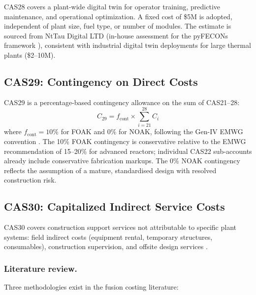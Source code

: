 \documentclass{article}
\begin{document}
CAS28 covers a plant-wide digital twin for operator training, predictive
maintenance, and operational optimization.  A fixed cost of \$5M is adopted,
independent of plant size, fuel type, or number of modules.  The estimate
is sourced from NtTau Digital LTD (in-house assessment for the pyFECONs
framework \citep{woodruff2026}), consistent with industrial digital twin
deployments for large thermal plants (\$2--10M).


\subsection{CAS29: Contingency on Direct Costs}
\label{sec:cas29}

CAS29 is a percentage-based contingency allowance on the sum of CAS21--28:
\begin{equation}
\label{eq:cas29}
C_{29} = f_{\text{cont}} \times \sum_{i=21}^{28} C_i
\end{equation}
\noindent where $f_{\text{cont}} = 10\%$ for FOAK and $0\%$ for NOAK,
following the Gen-IV EMWG convention \citep{emwg2007}.  The 10\% FOAK
contingency is conservative relative to the EMWG recommendation of 15--20\%
for advanced reactors; individual CAS22 sub-accounts already include
conservative fabrication markups.  The 0\% NOAK contingency reflects the
assumption of a mature, standardised design with resolved construction risk.


\subsection{CAS30: Capitalized Indirect Service Costs}
\label{sec:cas30}

CAS30 covers construction support services not attributable to specific
plant systems: field indirect costs (equipment rental, temporary
structures, consumables), construction supervision, and offsite design
services \citep{emwg2007}.

\subsubsection{Literature review.}
Three methodologies exist in the fusion costing literature:
\end{document}
